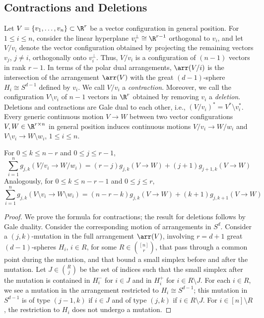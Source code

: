 \subsection{Contractions and Deletions}
\label{sec:deletion-contraction}
Let $V=\{v_1,\dots,v_n\} \subset \R^r$ be a vector configuration in general position. For $1\leq i\leq n$, consider the linear hyperplane $v_i^\bot \cong \R^{r-1}$ orthogonal to $v_i$, and let $V/v_i$ denote the vector configuration obtained by projecting the remaining vectors $v_j$, $j\neq i$, orthogonally onto $v_i^\bot $. Thus, $V/v_i$ is a configuration of $(n-1)$ vectors in rank $r-1$. In terms of the polar dual arrangements, $\arr(V/i)$ is the intersection of the arrangement $\arr(V)$ with the great $(d-1)$-sphere $H_i\cong S^{d-1}$ defined by $v_i$. We call $V/v_i$ a \emph{contraction}.
%
Moreover, we call the configuration $V\setminus v_i$ of $n-1$ vectors in $\R^r$ obtained by removing $v_i$ a \emph{deletion}. Deletions and contractions are Gale dual to each other, i.e., $(V/v_i)^*=V^*\! \setminus \!v_i^*$.
%
Every generic continuous motion $V\to W$ between two vector configurations $V,W \in \R^{r\times n}$ in general position induces continuous motions $V/v_i \to W/w_i$ and $V\setminus v_i \to W\setminus w_i$, $1\leq i \leq n$.
%
\begin{lemma}
\label{lem:g-contraction}
For $0\leq k\leq n-r$ and $0\leq j \leq r-1$,
\[
\sum_{i=1}^n g_{j,k}(V/v_i \to W/w_i)=(r-j)g_{j,k}(V\to W) + (j+1)g_{j+1,k}(V\to W)
\]
Analogously, for $0\leq k\leq n-r-1$ and $0\leq j\leq r$,
\[
\sum_{i=1}^n g_{j,k}(V \setminus  v_i \to W \setminus w_i)=(n-r-k)g_{j,k}(V\to W) + (k+1)g_{j,k+1}(V\to W)
\]
\end{lemma}
\begin{proof} We prove the formula for contractions; the result for deletions follows by Gale duality.
Consider the corresponding motion of arrangements in $S^d$. Consider a $(j,k)$-mutation in the full arrangement $\arr(V)$, involving $r=d+1$ great $(d-1)$-spheres $H_i$, $i\in R$, for some $R\in \binom{[n]}{r}$, that pass through a common point during the mutation, and that bound a small simplex before and after the mutation. Let $J\in \binom{R}{j}$ be the set of indices such that the small simplex after the mutation is contained in $H_i^-$ for $i\in J$ and in $H_i^+$ for $i\in R\setminus J$. For each $i\in R$, we see a mutation in the arrangement restricted to $H_i\cong S^{d-1}$; this mutation in $S^{d-1}$ is of type $(j-1,k)$ if $i\in J$ and of type $(j,k)$ if $i\in R\setminus J$. For $i\in [n]\setminus R$, the restriction to $H_i$ does not undergo a mutation.
\end{proof}
